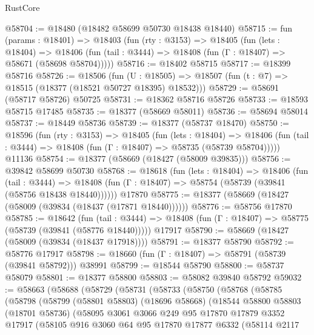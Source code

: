 \begin{lexlean}{RustCore}
\begin{coremodule}
@58704 := @18480 (@18482 @58699 @50730 @18438 @18440)
@58715 := fun (params : @18401) =>
  @18403
    (fun (rty : @3153) =>
    @18405
      (fun (lets : @18404) =>
      @18406 (fun (tail : @3444) => @18408 (fun (Γ : @18407) => @58671 (@58698 @58704)))))
@58716 := @18402 @58715
@58717 := @18399 @58716
@58726 := @18506
    (fun (U : @18505) => @18507 (fun (t : @7) => @18515 (@18377 (@18521 @50727 @18395) @18532)))
@58729 := @58691 (@58717 @58726) @50725
@58731 := @18362 @58716 @58726
@58733 := @18593 @58715 @17485
@58735 := @18377 (@58669 @58011)
@58736 := @58694 @58014
@58737 := @18449 @58736
@58739 := @18377 (@58737 @18470)
@58750 := @18596
    (fun (rty : @3153) =>
    @18405
      (fun (lets : @18404) =>
      @18406 (fun (tail : @3444) => @18408 (fun (Γ : @18407) => @58735 (@58739 @58704)))))
    @11136
@58754 := @18377 (@58669 (@18427 (@58009 @39835)))
@58756 := @39842 @58699 @50730
@58768 := @18618
    (fun (lets : @18404) =>
    @18406
      (fun (tail : @3444) =>
      @18408 (fun (Γ : @18407) => @58754 (@58739 (@39841 (@58756 @18438 @18440))))))
    @17870
@58775 := @18377 (@58669 (@18427 (@58009 (@39834 (@18437 (@17871 @18440))))))
@58776 := @58756 @17870
@58785 := @18642
    (fun (tail : @3444) => @18408 (fun (Γ : @18407) => @58775 (@58739 (@39841 (@58776 @18440)))))
    @17917
@58790 := @58669 (@18427 (@58009 (@39834 (@18437 @17918))))
@58791 := @18377 @58790
@58792 := @58776 @17917
@58798 := @18660 (fun (Γ : @18407) => @58791 (@58739 (@39841 @58792))) @38991
@58799 := @18544 @58790
@58800 := @58737 @58079
@58801 := @18377 @58800
@58803 := @58082 @39840 @58792
@59032 := @58663
    (@58688
      (@58729
        (@58731
          (@58733
            (@58750
              (@58768
                (@58785
                  (@58798
                    (@58799
                      (@58801 @58803)
                      (@18696 @58668)
                      (@18544
                        @58800
                        @58803
                        (@18701 @58736)
                        (@58095
                          @3061
                          @3066
                          @249
                          @95
                          @17870
                          @17879
                          @3352
                          @17917
                          (@58105
                            @916
                            @3060
                            @64
                            @95
                            @17870
                            @17877
                            @6332
                            (@58114
                              @2117

\end{coremodule}
\end{lexlean}
